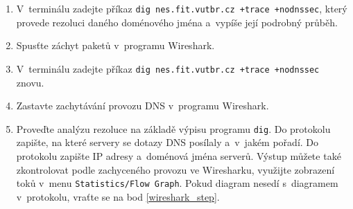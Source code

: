 \documentclass[a4paper,11pt]{article}
\begin{document}
\begin{enumerate}

  \item V~terminálu zadejte příkaz \texttt{dig nes.fit.vutbr.cz +trace +nodnssec}, který provede rezoluci daného doménového jména a~vypíše její podrobný průběh.

  \item \label{wireshark_step} Spusťte záchyt paketů v~programu Wireshark.

  \item V~terminálu zadejte příkaz \texttt{dig nes.fit.vutbr.cz +trace +nodnssec} znovu.

  \item Zastavte zachytávání provozu DNS v~programu Wireshark.

  \item Proveďte analýzu rezoluce na základě výpisu programu {\tt dig}. Do protokolu zapište, na které servery se dotazy DNS posílaly a~v~jakém pořadí. Do protokolu zapište IP adresy a~doménová jména serverů. Výstup můžete také zkontrolovat podle zachyceného provozu ve Wiresharku, využijte zobrazení toků v~menu {\tt Statistics/Flow Graph}. Pokud diagram nesedí s~diagramem v~protokolu, vraťte se na bod \ref{wireshark_step}.


\end{enumerate}
\end{document}
